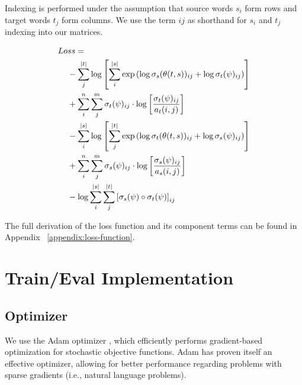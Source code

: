 \documentclass[twoside,twocolumn]{article}
\begin{document}
Indexing is performed under the assumption that source words $s_i$ form rows
and target words $t_j$ form columns. We use the term $ij$ as shorthand
for $s_i$ and $t_j$ indexing into our matrices.

\begin{equation}
  \centering
\begin{split}
  Lo&ss = \\
  &- \sum_j^{|t|} \log \left[
      \sum_i^{|s|} \exp \left(
        \log \sigma_s(\theta(t, s))_{ij} + \log \sigma_t(\psi)_{ij} \right)
    \right] \\
  &+ \sum_i^n \sum_j^m \sigma_t(\psi)_{ij} \cdot \log \left[
    \frac{\sigma_t(\psi)_{ij}}{a_t(i, j)} \right] \\
  &- \sum_i^{|s|} \log \left[ \sum_j^{|t|}
      \exp \left(
        \log \sigma_t(\theta(t, s))_{ij} + \log \sigma_s(\psi)_{ij}
      \right)
    \right] \\
  &+ \sum_i^n \sum_j^m \sigma_s(\psi)_{ij} \cdot \log \left[
    \frac{\sigma_s(\psi)_{ij}}{a_s(i, j)} \right] \\
  &- \log \sum_i^{|s|} \sum_j^{|t|} \left[
    \sigma_s(\psi) \circ \sigma_t(\psi) \right]_{ij} \\
\end{split}
\end{equation}

The full derivation of the loss function and its component terms can be found
in Appendix ~\ref{appendix:loss-function}.


\section{Train/Eval Implementation}



\subsection{Optimizer}
We use the Adam optimizer \cite{kingma2014adam}, which efficiently performs
gradient-based optimization for stochastic objective functions. Adam has proven
itself an effective optimizer, allowing for better performance regarding
problems with sparse gradients (i.e., natural language problems).
\end{document}
